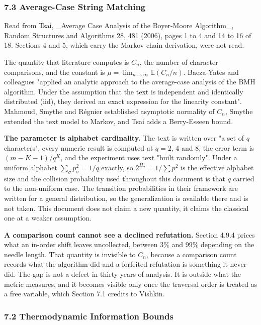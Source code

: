 \subsubsection{7.3 Average-Case String Matching}

Read from Tsai, \_Average Case Analysis of the Boyer-Moore Algorithm\_, Random Structures and Algorithms 28, 481 (2006), pages 1 to 4 and 14 to 16 of 18. Sections 4 and 5, which carry the Markov chain derivation, were not read.

The quantity that literature computes is \(C_n\), the number of character comparisons, and the constant is \(\mu = \lim_{n\to\infty} \mathbb{E}(C_n/n)\). Baeza-Yates and colleagues "applied an analytic approach to the average-case analysis of the BMH algorithm. Under the assumption that the text is independent and identically distributed (iid), they derived an exact expression for the linearity constant". Mahmoud, Smythe and Régnier established asymptotic normality of \(C_n\), Smythe extended the text model to Markov, and Tsai adds a Berry-Esseen bound.

\textbf{The parameter is alphabet cardinality.} The text is written over "a set of \(q\) characters", every numeric result is computed at \(q = 2\), 4 and 8, the error term is \((m-K-1)/q^K\), and the experiment uses text "built randomly". Under a uniform alphabet \(\sum_\sigma p_\sigma^2 = 1/q\) exactly, so \(2^{H_2} = 1/\sum p^2\) is the effective alphabet size and the collision probability used throughout this document is that \(q\) carried to the non-uniform case. The transition probabilities in their framework are written for a general distribution, so the generalization is available there and is not taken. This document does not claim a new quantity, it claims the classical one at a weaker assumption.

\textbf{A comparison count cannot see a declined refutation.} Section 4.9.4 prices what an in-order shift leaves uncollected, between 3\% and 99\% depending on the needle length. That quantity is invisible to \(C_n\), because a comparison count records what the algorithm did and a forfeited refutation is something it never did. The gap is not a defect in thirty years of analysis. It is outside what the metric measures, and it becomes visible only once the traversal order is treated as a free variable, which Section 7.1 credits to Vishkin.

\subsubsection{7.2 Thermodynamic Information Bounds}

